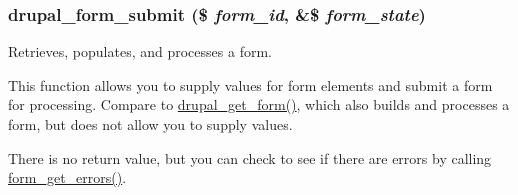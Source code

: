 \hypertarget{group__form__api_ga4312d7fe0602f6359153fc62cba1ca24}{
\subsubsection[{drupal\_\-form\_\-submit}]{\setlength{\rightskip}{0pt plus 5cm}drupal\_\-form\_\-submit (\$ {\em form\_\-id}, \/  \&\$ {\em form\_\-state})}}
\label{group__form__api_ga4312d7fe0602f6359153fc62cba1ca24}
Retrieves, populates, and processes a form.

This function allows you to supply values for form elements and submit a form for processing. Compare to \hyperlink{group__form__api_ga720df81a837b06dfe19daf1c1eea3437}{drupal\_\-get\_\-form()}, which also builds and processes a form, but does not allow you to supply values.

There is no return value, but you can check to see if there are errors by calling \hyperlink{group__form__api_ga158b3db5e88e96bf060c524cebcb8130}{form\_\-get\_\-errors()}.


